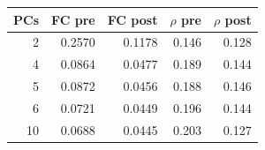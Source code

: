 \begin{tabular}{rrrrr}
\toprule
PCs & FC pre & FC post & $\rho$ pre & $\rho$ post \\
\midrule
2 & 0.2570 & 0.1178 & 0.146 & 0.128 \\
4 & 0.0864 & 0.0477 & 0.189 & 0.144 \\
5 & 0.0872 & 0.0456 & 0.188 & 0.146 \\
6 & 0.0721 & 0.0449 & 0.196 & 0.144 \\
10 & 0.0688 & 0.0445 & 0.203 & 0.127 \\
\bottomrule
\end{tabular}
